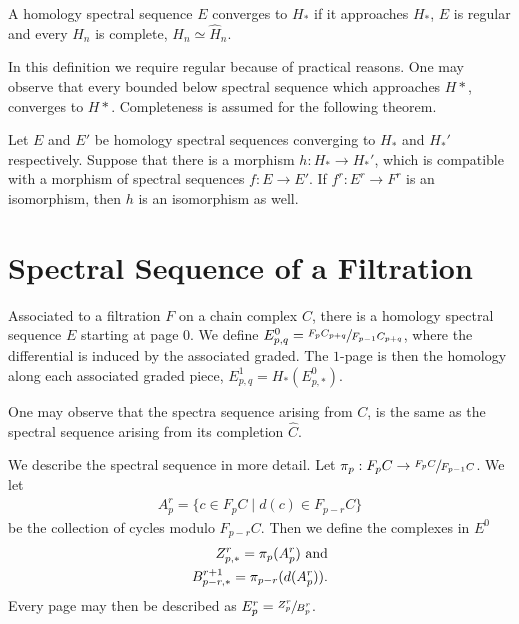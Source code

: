 \documentclass[../thesis.tex]{subfiles}
\begin{document}
        \begin{definition}[Convergence]
            A homology spectral sequence $E$ converges to $H_*$ if it approaches $H_*$, $E$ is regular and every $H_n$ is complete, $H_n \simeq \widehat{H}_n$.
        \end{definition}

        In this definition we require regular because of practical reasons. One may observe that every bounded below spectral sequence which approaches $H*$, converges to $H*$. Completeness is assumed for the following theorem. 

        \begin{thm}\label{thm: comp-thm}
            Let $E$ and $E'$ be homology spectral sequences converging to $H_*$ and $H_*'$ respectively. Suppose that there is a morphism $h : H_* \rightarrow H_*'$, which is compatible with a morphism of spectral sequences $f : E \rightarrow E'$. If $f^r : E^r \rightarrow F^r$ is an isomorphism, then $h$ is an isomorphism as well.
        \end{thm}

    \section{Spectral Sequence of a Filtration}

        Associated to a filtration $F$ on a chain complex $C$, there is a homology spectral sequence $E$ starting at page $0$. We define $E^0_{p,q} = \sfrac{F_pC_{p+q}}{F_{p-1}C_{p+q}}$, where the differential is induced by the associated graded. The $1$-page is then the homology along each associated graded piece, $E^1_{p,q} = H_*(E_{p,*}^0)$.

        One may observe that the spectra sequence arising from $C$, is the same as the spectral sequence arising from its completion $\widehat{C}$.

        We describe the spectral sequence in more detail. Let $\pi_p : F_pC \rightarrow \sfrac{F_pC}{F_{p-1}C}$. We let
        \begin{align*}
            A^r_p = \{c \in F_pC \mid d(c) \in F_{p-r}C\}
        \end{align*}
        be the collection of cycles modulo $F_{p-r}C$. Then we define the complexes in $E^0$
        \begin{align*}
            Z^r_{p,*} = \pi_p(A^r_p)\tt{ and}\\
            B^{r+1}_{p-r,*} = \pi_{p-r}(d(A^r_p))\tt{.}
        \end{align*}
        Every page may then be described as $E^r_p = \sfrac{Z^r_p}{B^r_p}$.
\end{document}
